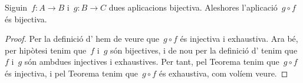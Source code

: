 \documentclass[../../main.tex]{subfiles}
\begin{document}
    \begin{theorem}
        \label{thm:composició de bijectives bijectiva}
        \label{thm:conjugació de bijectives bijectiva}
        Siguin~\(f\colon A\rightarrow B\) i~\(g\colon B\rightarrow C\) dues aplicacions bijectiva.
        Aleshores l'aplicació~\(g\circ f\) és bijectiva.
        \begin{proof}
            Per la definició d' hem de veure que~\(g\circ f\) és injectiva i exhaustiva.
            Ara bé, per hipòtesi tenim que~\(f\) i~\(g\) són bijectives, i de nou per la definició d' tenim que~\(f\) i~\(g\) són ambdues injectives i exhaustives.
            Per tant, pel Teorema  tenim que~\(g\circ f\) és injectiva, i pel Teorema  tenim que~\(g\circ f\) és exhaustiva, com volíem veure.
        \end{proof}
    \end{theorem}
\end{document}

